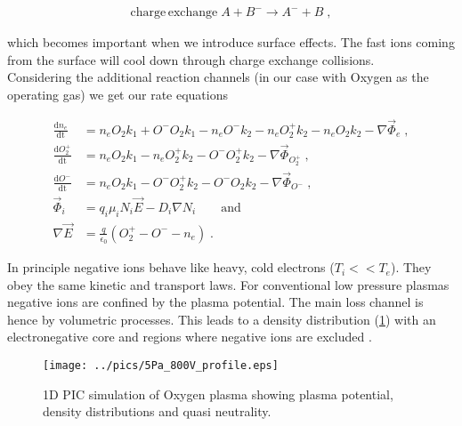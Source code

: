 \begin{align}
    \mathrm{charge\, exchange} \; A + B^- \rightarrow A^- + B  \; ,
\end{align}

which becomes important when we introduce surface effects.
The fast ions coming from the surface will cool down through charge exchange collisions.\\
Considering the additional reaction channels (in our case with Oxygen as the operating gas) we get our rate equations

\begin{align}
    \frac{\mathrm{d}n_e}{\mathrm{dt}}&=n_e O_2 k_1 + O^- O_2 k_1 - n_e O^- k_2 - n_e O_2^+ k_2 - n_e O_2 k_2 - \nabla \vec{\Phi}_e \nonumber \; ,\\
    \frac{\mathrm{d}O_2^+}{\mathrm{dt}}&=n_e O_2 k_1 - n_e O_2^+ k_2 - O^- O_2^+ k_2 - \nabla \vec{\Phi}_{O_2^+} \nonumber \; , \\
    \frac{\mathrm{d}O^-}{\mathrm{dt}}&=n_e O_2 k_1 - O^- O_2^+ k_2 - O^- O_2 k_2 - \nabla \vec{\Phi}_{O^-} \nonumber \; ,\\
    \vec{\Phi}_i&= q_i\mu_iN_i\vec{E}-D_i\nabla N_i \nonumber \qquad \mathrm{and} \\
    \nabla \vec{E}&= \frac{q}{\epsilon_0}\left( O_2^+ - O^- - n_e\right) \; .
\label{rates}
\end{align}

In principle negative ions behave like heavy, cold electrons ($T_i<<T_e$).
They obey the same kinetic and transport laws.
For conventional low pressure plasmas negative ions are confined by the plasma potential.
The main loss channel is hence by volumetric processes.
This leads to a density distribution (\ref{fig:profile}) with an electronegative core and regions where negative ions are excluded \cite{profile}.\\

\begin{figure}[htbp]
\centering
\texttt{[image: ../pics/5Pa\_800V\_profile.eps]}
\caption{1D PIC simulation of Oxygen plasma showing plasma potential, density distributions and quasi neutrality.}
\label{fig:profile}
\end{figure}



